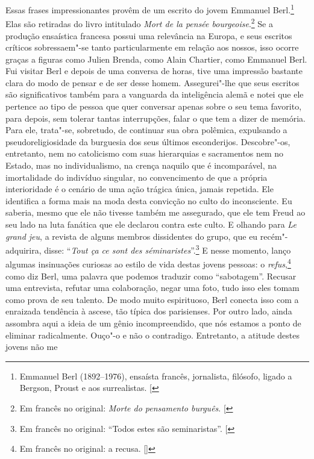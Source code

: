Essas frases impressionantes provêm de um escrito do jovem Emmanuel
Berl.\footnote{Emmanuel Berl (1892--1976), ensaísta francês,
  jornalista, filósofo, ligado a Bergson, Proust e aos surrealistas. {[}\versal{N.~O.}{]}}
Elas são retiradas do livro intitulado \emph{Mort de la pensée
bourgeoise}.\footnote{Em francês no original: \emph{Morte do pensamento burguês}. {[}\versal{N.~T.}{]}} Se a  produção ensaística francesa possui uma relevância na Europa, e seus escritos críticos sobressaem"-se tanto
particularmente em relação aos nossos, isso ocorre graças a figuras
como Julien Brenda, como Alain Chartier, como Emmanuel Berl. Fui visitar
Berl e depois de uma conversa de horas, tive uma impressão bastante
clara do modo de pensar e de ser desse homem. Assegurei"-lhe que seus
escritos são significativos também para a vanguarda da inteligência
alemã e notei que ele pertence ao tipo de pessoa que quer conversar apenas sobre o seu tema favorito, para depois, sem tolerar tantas interrupções, falar o que tem a dizer de memória. Para ele, trata"-se, sobretudo, de
continuar sua obra polêmica, expulsando a pseudoreligiosidade da
burguesia dos seus últimos esconderijos. Descobre"-os, entretanto, nem no
catolicismo com suas hierarquias e sacramentos nem no Estado, mas no
individualismo, na crença naquilo que é incomparável, na imortalidade do
indivíduo singular, no convencimento de que a própria interioridade é o
cenário de uma ação trágica única, jamais repetida. Ele identifica a forma
mais na moda desta convicção no culto do inconsciente. Eu saberia, mesmo que ele não tivesse também me assegurado, que ele tem Freud ao seu lado na luta fanática que ele declarou contra este culto. E olhando
para \emph{Le grand jeu}, a revista de alguns membros dissidentes do
grupo, que eu recém"-adquirira, disse: ``\emph{Tout ça ce sont des
séminaristes}''.\footnote{Em francês no original: ``Todos estes são
  seminaristas''. {[}\versal{N.~T.}{]}} E  nesse momento, lanço algumas insinuações curiosas ao estilo de
vida destas jovens pessoas: o \emph{refus},\footnote{Em francês no original: a recusa. []} como diz Berl, uma palavra que podemos traduzir como ``sabotagem''.
Recusar uma entrevista, refutar uma colaboração, negar uma foto, tudo
isso eles tomam como prova de seu talento. De modo muito espirituoso,
Berl conecta isso com a enraizada tendência à ascese, tão típica dos
parisienses. Por outro lado, ainda assombra aqui a ideia de um gênio incompreendido,
que nós estamos a ponto de eliminar radicalmente.
Ouço"-o e não o contradigo. Entretanto, a atitude destes jovens não me
